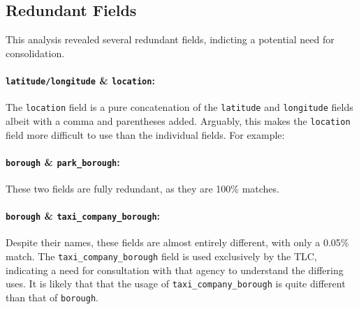\documentclass[linenumber]{jdsart}
\begin{document}
\subsection{Redundant Fields}
\label{sec:duplicates}
This analysis revealed several redundant fields, indicting a potential need 
for consolidation.

\paragraph{\texttt{latitude/longitude} \& \texttt{location}:} 
The \texttt{location} field is a pure concatenation of 
the \texttt{latitude} and \texttt{longitude} fields albeit with a 
comma and parentheses added. Arguably, this makes the \texttt{location} field 
more difficult to use than the individual fields. For example: 

\begin{center}
\end{center}

\paragraph{\texttt{borough} \& \texttt{park\_borough}:} These two fields are fully redundant, 
as they are 100\% matches.

\paragraph{\texttt{borough} \& \texttt{taxi\_company\_borough}:} Despite 
their names, these fields are almost entirely different, with only 
a 0.05\% match. The \texttt{taxi\_company\_borough} field is 
used exclusively by the TLC, indicating a need for consultation 
with that agency to understand the differing uses. It is 
likely that that the usage of \texttt{taxi\_company\_borough} is 
quite different than that of \texttt{borough}. 
\end{document}
